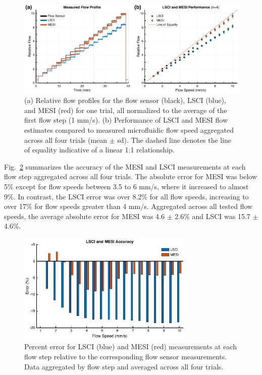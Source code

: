 \documentclass[12pt]{spieman}
\begin{document}
\begin{spacing}{2}
\begin{figure}
    \includegraphics[width=\textwidth]{Figure6.pdf}
    \caption {
        (a) Relative flow profiles for the flow sensor (black), LSCI (blue), and MESI (red) for one trial, all normalized to the average of the first flow step (1 mm/s). (b) Performance of LSCI and MESI flow estimates compared to measured microfluidic flow speed aggregated across all four trials (mean $\pm$ sd). The dashed line denotes the line of equality indicative of a linear 1:1 relationship.
    }
    \label{fig:flow_mesi_lsci}
\end{figure}

Fig.~\ref{fig:error} summarizes the accuracy of the MESI and LSCI measurements at each flow step aggregated across all four trials. The absolute error for MESI was below 5\% except for flow speeds between 3.5 to 6 mm/s, where it increased to almost 9\%. In contrast, the LSCI error was over 8.2\% for all flow speeds, increasing to over 17\% for flow speeds greater than 4 mm/s. Aggregated across all tested flow speeds, the average absolute error for MESI was 4.6 $\pm$ 2.6\% and LSCI was 15.7 $\pm$ 4.6\%.

\begin{figure}
    \centering
    \includegraphics[width=0.75\textwidth]{Figure7.pdf}
    \caption {
        Percent error for LSCI (blue) and MESI (red) measurements at each flow step relative to the corresponding flow sensor measurements. Data aggregated by flow step and averaged across all four trials.
    }
    \label{fig:error}
\end{figure}



\end{spacing}
\end{document}
